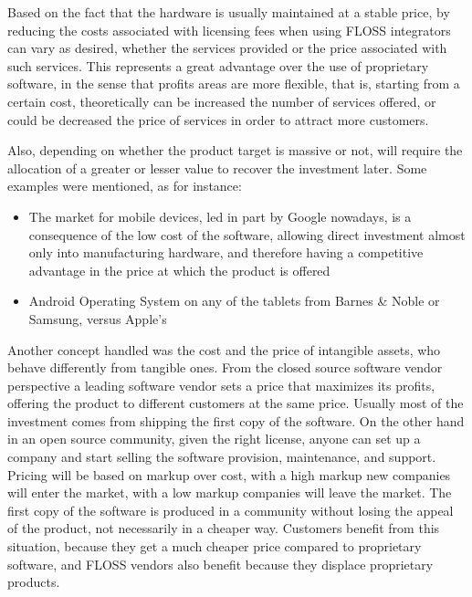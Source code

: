 Based on the fact that the hardware is usually maintained at a stable price, by reducing the costs associated with licensing fees when using FLOSS integrators can vary as desired, whether the services provided or the price associated with such services. This represents a great advantage over the use of proprietary software, in the sense that profits areas are more flexible, that is, starting from a certain cost, theoretically can be increased the number of services offered, or could be decreased the price of services in order to attract more customers.\\

\pagebreak

Also, depending on whether the product target is massive or not, will require the allocation of a greater or lesser value to recover the investment later. Some examples were mentioned, as for instance:

\begin{itemize}
\item The market for mobile devices, led in part by Google nowadays, is a consequence of the low cost of the software, allowing direct investment almost only into manufacturing hardware, and therefore having a competitive advantage in the price at which the product is offered
\item Android Operating System on any of the tablets from Barnes \& Noble or Samsung, versus Apple's
\end{itemize}

Another concept handled was the cost and the price of intangible assets, who behave differently from tangible ones. From the closed source software vendor perspective a leading software vendor sets a price that maximizes its profits, offering the product to different customers at the same price. Usually most of the investment comes from shipping the first copy of the software. On the other hand in an open source community, given the right license, anyone can set up a company and start selling the software provision, maintenance, and support. Pricing will be based on markup over cost, with a high markup new companies will enter the market, with a low markup companies will leave the market. The first copy of the software is produced in a community without losing the appeal of the product, not necessarily in a cheaper way. Customers benefit from this situation, because they get a much cheaper price compared to proprietary software, and FLOSS vendors also benefit because they displace proprietary products.\\

